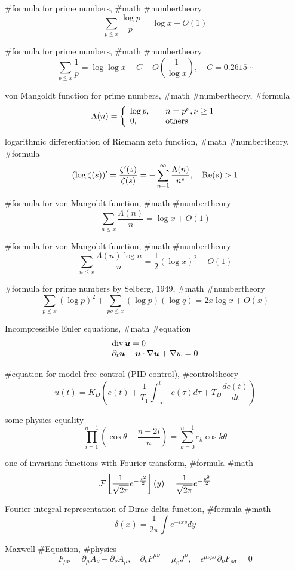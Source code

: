 #formula for prime numbers,  #math #numbertheory
$$
\sum_{p \leqq x}\frac{\log p}{p} = \log x+O(1)
$$

#formula for prime numbers, #math #numbertheory
$$
\sum_{p \leqq x}\frac{1}{p} = \log\log x+C+O\left(\frac{1}{\log x}\right), \quad C=0.2615\cdots
$$

von Mangoldt function for prime numbers, #math #numbertheory, #formula
$$
\Lambda(n)=
\left\{
\begin{array}{ll}
\log p, & \quad n=p^\nu, \nu \ge 1 \\
0, & \quad {\rm others}
\end{array}
\right.
$$

logarithmic differentiation of Riemann zeta function, #math #numbertheory, #formula
$$
(\log \zeta(s))'=\frac{\zeta'(s)}{\zeta(s)}=-\sum^\infty_{n=1}\frac{\Lambda(n)}{n^s}, \quad {\rm Re}{(s)}>1
$$

#formula for von Mangoldt function, #math #numbertheory
$$
\sum_{n \le x}\frac{\Lambda(n)}{n}=\log x+O(1)
$$

#formula for von Mangoldt function, #math #numbertheory
$$
\sum_{n \le x}\frac{\Lambda(n)\log n}{n}=\frac{1}{2}(\log x)^2+O(1)
$$

#formula for prime numbers by Selberg, 1949, #math #numbertheory
$$
\sum_{p \le x}(\log p)^2+\sum_{pq \le x}(\log p)(\log q)=2x\log x+O(x)
$$

Incompressible Euler equations, #math #equation
$$
\begin{array}{l}
{\rm div}\,{\boldsymbol u}=0 \\
\partial_t {\boldsymbol u}+{\boldsymbol u}\cdot \nabla {\boldsymbol u}+\nabla w=0
\end{array}
$$

#equation for model free control (PID control), #controltheory
$$
u(t)=K_D\left(e(t)+\frac{1}{T_1}\int^t_{-\infty}e(\tau)d\tau+T_D\frac{de(t)}{dt}\right)
$$

some physics equality
$$
\prod^{n-1}_{i=1}\left(\cos\theta-\frac{n-2i}{n}\right)=\sum_{k=0}^{n-1} c_k \cos k\theta
$$

one of invariant functions with Fourier transform, #formula #math
$$
{\cal F}\left[\frac{1}{\sqrt{2\pi}}e^{-\frac{x^2}{2}}\right](y)=\frac{1}{\sqrt{2\pi}}e^{-\frac{y^2}{2}}
$$

Fourier integral representation of Dirac delta function,  #formula #math
$$
\delta(x)=\frac{1}{2\pi}\int e^{-ixy}dy
$$

Maxwell #Equation, #physics 
$$
F_{\mu\nu}=\partial_\mu A_\nu-\partial_\nu A_\mu, \quad \partial_\nu F^{\mu\nu}=\mu_0 J^\mu, \quad \epsilon^{\mu\nu\rho\sigma}\partial_\nu F_{\rho\sigma}=0
$$

